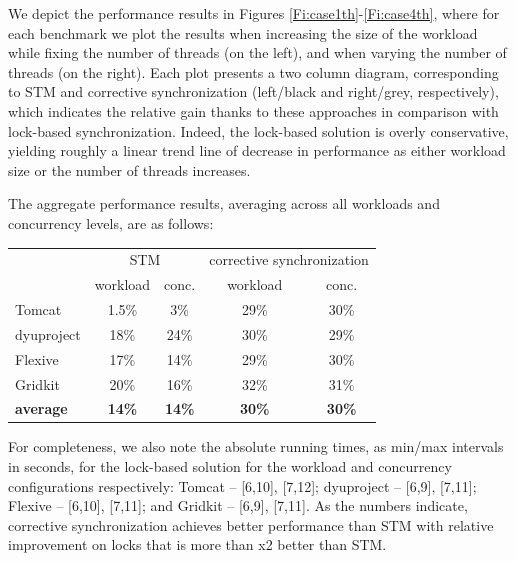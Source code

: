 We depict the performance results in Figures \ref{Fi:case1th}-\ref{Fi:case4th}, where for each benchmark we plot the results when increasing the size of the workload while fixing the number of threads (on the left), and when varying the number of threads (on the right).
Each plot presents a two column diagram, corresponding to STM and corrective synchronization (left/black and right/grey, respectively), which indicates the relative gain thanks to these approaches in comparison with lock-based synchronization. Indeed, the lock-based solution is overly conservative, yielding roughly a linear trend line of decrease in performance as either workload size or the number of threads increases.


The aggregate performance results, averaging across all workloads and concurrency levels, are as follows:
\begin{center}
	\footnotesize
\begin{tabular}{l|c|c|c|c}
					& \multicolumn{2}{c|}{STM} & \multicolumn{2}{c}{corrective synchronization} \\
					\cline{2-5} 
					& workload & conc. & workload & conc. \\
\hline
Tomcat	  	 &	1.5\%		&	3\% & 29\%		& 30\% \\			   
dyuproject	 & 	18\%		& 	24\%	    & 30\% &	29\%	\\
Flexive 		&	17\%	  &		14\%			& 29\% & 30\%	\\ 
Gridkit 		&	20\% 	&		16\%		& 32\% & 31\%	\\
\hline\hline	
{\bf average} & {\bf 14\%} 	&   {\bf 14\%}    & {\bf 30\%}   & {\bf 30\%} \\
\end{tabular}
\end{center}
For completeness, we also note the absolute running times, as min/max intervals in seconds, for the lock-based solution for the workload and concurrency configurations respectively: Tomcat -- [6,10], [7,12]; dyuproject -- [6,9], [7,11]; Flexive -- [6,10], [7,11]; and Gridkit -- [6,9], [7,11]. 
As the numbers indicate, corrective synchronization achieves better performance than STM with relative improvement on locks that is more than x2 better than STM.

